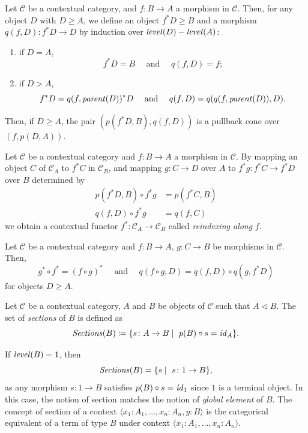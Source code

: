 \begin{lemma}
    Let $\mathcal{C}$ be a contextual category, and $f \colon B \to A$ a morphism in $\mathcal{C}$.
    Then, for any object $D$ with $D \geq A$, we define an object $f^*D \geq B$ and a morphism 
    $q(f, D) \colon f^*D \to D$ by induction over $\operatorname{\mathit{level}} (D) - \operatorname{\mathit{level}} (A)$:
    \begin{enumerate}
        \item if $D = A$, \[
                f^*D = B \quad \text{ and } \quad q(f, D) = f;
              \]
        \item if $D > A$, \[
                f^*D = q(f, \operatorname{\mathit{parent}}(D))^*D
                    \quad \text{ and } \quad 
                q(f, D) = q(q(f, \operatorname{\mathit{parent}}(D)), D).
              \]
    \end{enumerate}
    Then, if $D \geq A$, the pair $(p(f^*D, B), q(f, D))$ is a pullback cone over $(f, p(D, A))$.
\end{lemma}
\begin{theorem}
    Let $\mathcal{C}$ be a contextual category and $f \colon B \to A$ a morphism in $\mathcal{C}$.
    By mapping an object $C$ of $\mathcal{C}_A$ to $f^*C$ in $\mathcal{C}_B$,
    and mapping $g \colon C \to D$ over $A$ to $f^*g \colon f^*C \to f^*D$ over $B$
    determined by
    \begin{align*}
        p(f^*D, B) \circ f^*g &= p(f^*C, B) \\
           q(f, D) \circ f^*g &= q(f, C)
    \end{align*}
    we obtain a contextual functor $f^* \colon \mathcal{C}_A \to \mathcal{C}_B$
    called \textit{reindexing along} $f$.
\end{theorem}

\begin{theorem}
    Let $\mathcal{C}$ be a contextual category and $f \colon B \to A$, $g \colon C \to B$ be morphisms in $\mathcal{C}$.
    Then, \[
        g^* \circ f^* = (f \circ g)^* 
            \quad \text{ and } \quad
        q(f \circ g, D) = q(f, D) \circ q(g, f^*D)
    \]
    for objects $D \geq A$.
\end{theorem}

\begin{definition} \cite{streicher}
    Let $\mathcal{C}$ be a contextual category, $A$ and $B$ be objects of $\mathcal{C}$ such that $A \lhd B$.
    The set of \textit{sections} of $B$ is defined as 
    \begin{equation*}
        \operatorname{\mathit{Sections}}(B) \coloneqq \{ s \colon A \to B   \mid\  p(B) \circ s = \operatorname{\mathit{id}}_A\}.
    \end{equation*}
\end{definition}
If $\operatorname{\mathit{level}}(B) = 1$, then 
\[
    \operatorname{\mathit{Sections}}(B) = \{ s  \mid\  s \colon 1 \to B \},
\]
as any morphism $s \colon 1 \to B$ satisfies $p(B) \circ s = \operatorname{\mathit{id}}_1$ since
$1$ is a terminal object. In this case, the notion of section
matches the notion of \textit{global element} of $B$. 
The concept of section of a context $\langle x_1 \colon A_1, \dots, x_n \colon A_n, y \colon B \rangle$ is 
the categorical equivalent of a term of type $B$ under context $\langle x_1 \colon A_1, \dots, x_n \colon A_n \rangle$.

